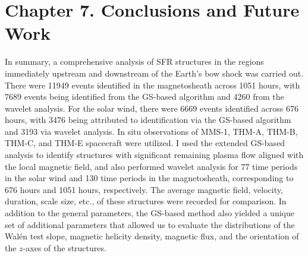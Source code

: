 \chapter{Chapter 7. Conclusions and Future Work}

In summary, a comprehensive analysis of SFR structures in the regions immediately upstream and downstream of the Earth's bow shock was carried out. There were 11949 events identified in the magnetosheath across 1051 hours, with 7689 events being identified from the GS-based algorithm and 4260 from the wavelet analysis. For the solar wind, there were 6669 events identified across 676 hours, with 3476 being attributed to identification via the GS-based algorithm and 3193 via wavelet analysis. In situ observations of MMS-1, THM-A, THM-B, THM-C, and THM-E spacecraft were utilized. I used the extended GS-based analysis to identify structures with significant remaining plasma flow aligned with the local magnetic field, and also performed wavelet analysis for 77 time periods in the solar wind and 130 time periods in the magnetosheath, corresponding to 676 hours and 1051 hours, respectively. The average magnetic field, velocity, duration, scale size, etc., of these structures were recorded for comparison. In addition to the general parameters, the GS-based method also yielded a unique set of additional parameters that allowed us to evaluate the distributions of the Wal\'en test slope, magnetic helicity density, magnetic flux, and the orientation of the $z$-axes of the structures.

